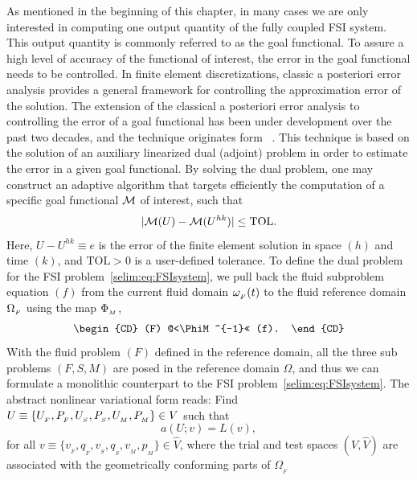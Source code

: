 As mentioned in the beginning of this chapter, in many cases we are
only interested in computing one output quantity of the fully coupled
FSI system. This output quantity is commonly referred to as the goal
functional.  To assure a high level of accuracy of the functional of
interest, the error in the goal functional needs to be controlled. In
finite element discretizations, classic a posteriori error analysis
provides a general framework for controlling the approximation error
of the solution.  The extension of the classical a posteriori error
analysis to controlling the error of a goal functional has been under
development over the past two decades, and the technique originates
form ~\cite{ ErikssonEstepEtAl1995, BeckerRannacher2001}. This
technique is based on the solution of an auxiliary linearized dual
(adjoint) problem in order to estimate the error in a given goal
functional. By solving the dual problem, one may construct an adaptive
algorithm that targets efficiently the computation of a specific goal
functional $\mathcal{M}$ of interest, such that
\begin{equation}           
  \label{selim:eq:goalTOL}
|\mathcal{M}(U)-\mathcal{M}(U^{hk})| \leq \mathrm{TOL}.
\end{equation}
Here, $ U-U^{hk} \equiv e$ is the error of the finite element solution
in space $(h)$ and time $(k)$, and $\mathrm{TOL}>0$ is a user-defined
tolerance.  To define the dual problem for the FSI
problem~\eqref{selim:eq:FSIsystem}, we pull back the fluid subproblem
equation $(f)$ from the current fluid domain $\omega_{_{F}}(t)$ to the fluid
reference domain $\Omega_{_{F}}$ using the map $\Phi_{_{M}}$,
\begin{equation}
  \label{selim:eq:pullback}
  \begin{CD}
    (F) @<\PhiM^{-1}<< (f).
  \end{CD}
\end{equation}
With the fluid problem $(F)$ defined in the reference domain, all the
three sub problems $(F,S,M)$ are posed in the reference domain
$\Omega$, and thus we can formulate a monolithic counterpart to the
FSI problem~\eqref{selim:eq:FSIsystem}. The abstract nonlinear
variational form reads: Find $U\equiv \{ U_{_{F}}, P_{_{F}}, U_{_{S}}, P_{_{S}}, U_{_{M}},
P_{_{M}} \}\in V$ such that
\begin{equation}
\label{selim:eq:monolithic}
a(U;v) = L(v), 
\end{equation}
for all $v\equiv \{ v_{_{F}}, q_{_{F}}, v_{_{S}}, q_{_{S}}, v_{_{M}}, p_{_{M}}
\}\in\hat{V}$, where the trial and test spaces $(V,\hat{V})$ are
associated with the geometrically conforming parts of $\Omega_{_{F}}$
